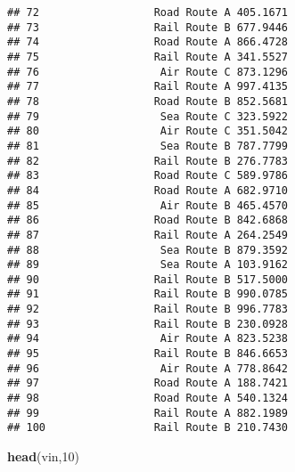 \documentclass[
]{article}
\newenvironment{Shaded}{\begin{snugshade}}{\end{snugshade}}
\newcommand{\DecValTok}[1]{\textcolor[rgb]{0.00,0.00,0.81}{#1}}
\newcommand{\FunctionTok}[1]{\textcolor[rgb]{0.13,0.29,0.53}{\textbf{#1}}}
\newcommand{\NormalTok}[1]{#1}
\begin{document}
\begin{verbatim}
## 72                  Road Route A 405.1671
## 73                  Rail Route B 677.9446
## 74                  Road Route A 866.4728
## 75                  Rail Route A 341.5527
## 76                   Air Route C 873.1296
## 77                  Rail Route A 997.4135
## 78                  Road Route B 852.5681
## 79                   Sea Route C 323.5922
## 80                   Air Route C 351.5042
## 81                   Sea Route B 787.7799
## 82                  Rail Route B 276.7783
## 83                  Road Route C 589.9786
## 84                  Road Route A 682.9710
## 85                   Air Route B 465.4570
## 86                  Road Route B 842.6868
## 87                  Rail Route A 264.2549
## 88                   Sea Route B 879.3592
## 89                   Sea Route A 103.9162
## 90                  Rail Route B 517.5000
## 91                  Rail Route B 990.0785
## 92                  Rail Route B 996.7783
## 93                  Rail Route B 230.0928
## 94                   Air Route A 823.5238
## 95                  Rail Route B 846.6653
## 96                   Air Route A 778.8642
## 97                  Road Route A 188.7421
## 98                  Road Route A 540.1324
## 99                  Rail Route A 882.1989
## 100                 Rail Route B 210.7430
\end{verbatim}

\begin{Shaded}
\begin{Highlighting}[]
\FunctionTok{head}\NormalTok{(vin,}\DecValTok{10}\NormalTok{)}
\end{Highlighting}
\end{Shaded}
\end{document}
